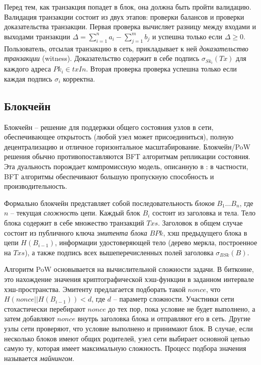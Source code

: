 \documentclass[specification,annotation]{itmo-student-thesis}
\begin{document}
Перед тем, как транзакция попадет в блок, она должна быть
пройти валидацию. Валидация транзакции состоит из двух этапов: проверки
балансов и проверки доказательства транзакции. Первая проверка
вычисляет разницу между входами и выходами транзакции $\Delta =
\sum_{i=1}^n{a_i} - \sum_{j=1}^m{b_j}$ и успешна только если $\Delta
\geq 0$. Пользователь, отсылая транзакцию в сеть, прикладывает к ней
{\it доказательство транзакции} (witness). Доказательство
содержит в себе подпись $\sigma_{Sk_i}(Tx)$ для каждого адреса
$Pk_i \in txIn$. Вторая проверка проверка успешна только если
каждая подпись $\sigma_i$ корректна.

\subsection{Блокчейн}

Блокчейн -- решение для поддержки общего состояния узлов в сети,
обеспечивающее открытость (любой узел может присоединиться), полную
децентрализацию и отличное горизонтальное
масштабирование. Блокчейн/PoW решения обычно противопоставляются BFT
алгоритмам репликации состояния. Эта дуальность порождает
компромиссную модель, описанную в \cite{powbftquest}: в частности, BFT
алгоритмы обеспечивают большую пропускную способность и
производительность.

Формально блокчейн представляет собой последовательность {\it блоков}
$B_1 \ldots B_n$, где $n$ -- текущая {\it сложность} цепи. Каждый блок
$B_i$ состоит из заголовка и тела. Тело блока содержит в себе
множество транзакций $Txs$. Заголовок в общем случае состоит из
публичного ключа {\it эмитента блока} $BPk$, хэш предыдущего блока в
цепи $H(B_{i-1})$, информации удостоверяющей тело (дерево меркла,
построенное на $Txs$), а также подпись всех вышеперечисленных полей
заголовка $\sigma_{BSk}(B)$.

Алгоритм PoW основывается на вычислительной сложности задачи. В
биткоине, это нахождение значения криптографической хэш-функции в
заданном интервале хэш-пространства. Эмитенту предлагается подборать
такой $nonce$, что $H(nonce || H(B_{i-1})) < d$, где $d$ -- параметр
сложности. Участники сети стохастически перебирают $nonce$ до тех пор,
пока условие не будет выполнено, а затем добавляют $nonce$ внутрь
заголовка блока и отправляют его в сеть. Другие узлы сети проверяют,
что условие выполнено и принимают блок. В случае, если несколько
блоков имеют общих родителей, узел сети выбирает основной цепью самую
ту, которая имеет максимальную сложность. Процесс подбора значения
называется {\it майнингом}.
\end{document}
